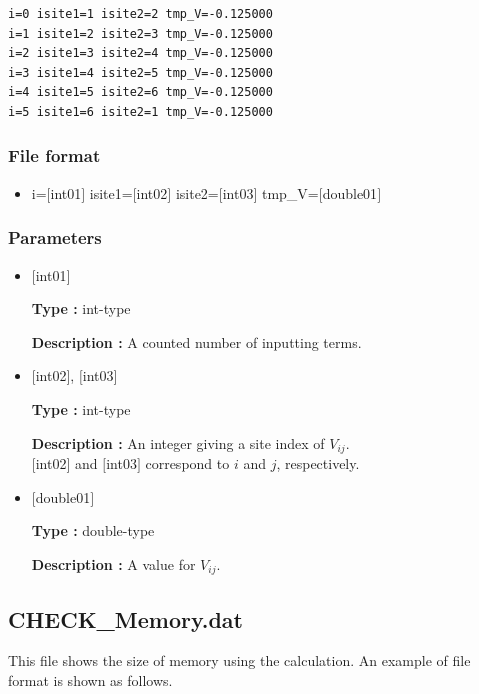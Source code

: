 \begin{minipage}{12.5cm}
\begin{screen}
\begin{verbatim}
i=0 isite1=1 isite2=2 tmp_V=-0.125000 
i=1 isite1=2 isite2=3 tmp_V=-0.125000 
i=2 isite1=3 isite2=4 tmp_V=-0.125000 
i=3 isite1=4 isite2=5 tmp_V=-0.125000 
i=4 isite1=5 isite2=6 tmp_V=-0.125000 
i=5 isite1=6 isite2=1 tmp_V=-0.125000 
\end{verbatim}
\end{screen}
\end{minipage}

\subsubsection{File format}
 \begin{itemize}
   \item  i=$[$int01$]$ isite1=$[$int02$]$ isite2=$[$int03$]$ tmp\_V=$[$double01$]$ 
 \end{itemize}
 
\subsubsection{Parameters}
 \begin{itemize}

    \item  $[$int01$]$ 
   
    {\bf Type :} int-type

   {\bf Description :} A counted number of inputting terms.
      
   \item  $[$int02$]$, $[$int03$]$
   
    {\bf Type :} int-type

    {\bf Description :}  An integer giving a site index of $V_{ij}$. \\
    $[$int02$]$ and $[$int03$]$ correspond to $i$ and $j$, respectively.
 
   \item  $[$double01$]$ 
   
    {\bf Type :} double-type

   {\bf Description :} A value for $V_{ij}$.
\end{itemize}


\newpage
\subsection{CHECK\_Memory.dat}
This file shows the size of memory using the calculation.
An example of file format is shown as follows.

